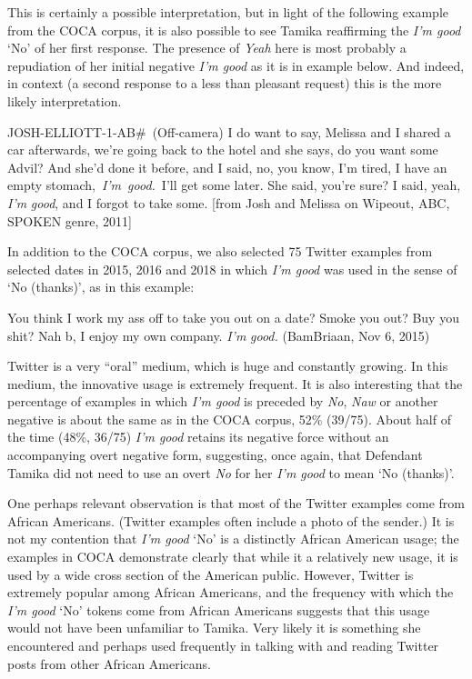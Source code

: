 \documentclass[output=paper,colorlinks,citecolor=brown]{langscibook}
\begin{document}
        
This is certainly a possible interpretation, but in light of the following example  from the COCA corpus, it is also possible to see Tamika reaffirming the \textit{I'm good} `No' of her first response.  The presence of \textit{Yeah} here is most probably a repudiation of her initial negative \textit{I'm good} as it is in example   below.  And indeed, in context (a second response to a less than pleasant request) this is the more likely interpretation. 

\ea%
  \label{ex:rickford:16}
JOSH-ELLIOTT-1-AB\#~(Off-camera) I do want to say, Melissa and I shared a car afterwards, we're going back to the hotel and she says, do you want some Advil? And she'd done it before, and I said, no, you know, I'm tired, I have an empty stomach,~\textit{I{}'m}~\textit{good.}~I'll get some later. She said, you're sure? I said, yeah, \textit{I'm} \textit{good}, and I forgot to take some.  [from Josh and Melissa on Wipeout, ABC, SPOKEN genre, 2011]
\z
         
In addition to the COCA corpus, we also selected 75 Twitter examples from selected dates in 2015, 2016 and 2018 in which \textit{I'm good} was used in the sense of `No (thanks)', as in this example:

 \ea%
    \label{ex:rickford:17}
 You think I work my ass off to take you out on a date?  Smoke you out?  Buy you shit?    Nah b, I enjoy my own company.  \textit{I'm} \textit{good.} (BamBriaan, Nov 6, 2015)
\z
 

Twitter is a very “oral” medium, which is huge and constantly growing.  In this medium, the innovative usage is extremely frequent.  It is also interesting that the percentage of examples in which \textit{I'm good} is preceded by \textit{No}, \textit{Naw} or another negative is about the same as in the COCA corpus, 52\% (39/75).  About half of the time (48\%, 36/75) \textit{I'm good} retains its negative force without an accompanying overt negative form, suggesting, once again, that Defendant Tamika did not need to use an overt \textit{No} for her \textit{I'm good} to mean `No (thanks)'.

One perhaps relevant observation is that most of the Twitter examples come from African Americans.  (Twitter examples often include a photo of the sender.) It is not my contention that \textit{I'm good} `No' is a distinctly African American usage; the examples in COCA demonstrate clearly that while it a relatively new usage, it is used by a wide cross section of the American public.  However, Twitter is extremely popular among African Americans, and the frequency with which the \textit{I'm good} `No' tokens come from African Americans suggests that this usage would not have been unfamiliar to Tamika.   Very likely it is something she encountered and perhaps used frequently in talking with and reading Twitter posts from other African Americans.
\end{document}
